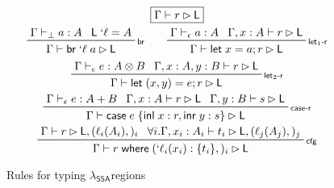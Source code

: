 \documentclass[acmsmall,screen,review]{acmart}
\newcommand{\ms}[1]{\ensuremath{\mathsf{#1}}}
\newcommand{\lbl}[1]{{`#1}}
\newcommand{\lto}{:}
\newcommand{\linl}[1]{\ms{inl}\;{#1}}
\newcommand{\linr}[1]{\ms{inr}\;{#1}}
\newcommand{\letstmt}[3]{\ensuremath{\ms{let}\;#1 = #2; #3}}
\newcommand{\brb}[2]{\ms{br}\;#1\;#2}
\newcommand{\lbrb}[2]{\brb{\lbl{#1}}{#2}}
\newcommand{\casestmt}[5]{\ms{case}\;#1\;\{\linl{#2} \lto #3, \linr{#4} \lto #5\}}
\newcommand{\where}[2]{#1\;\ms{where}\;#2}
\newcommand{\wbranch}[3]{#1(#2) \lto \{#3\}}
\newcommand{\lwbranch}[3]{\wbranch{\lbl{#1}}{#2}{#3}}
\newcommand{\bhyp}[2]{#1 : #2}
\newcommand{\lhyp}[2]{#1(#2)}
\newcommand{\rle}[1]{{\scriptsize\textsf{#1}}}
\newcommand{\hasty}[4]{#1 \vdash_{#2} #3: {#4}}
\newcommand{\haslb}[3]{#1 \vdash #2 \rhd #3}
\newcommand{\isotopessa}{\(\lambda_{\ms{SSA}}\)}
\begin{document}
\begin{figure}[H]
  \begin{gather*}
    \boxed{\haslb{\Gamma}{r}{\ms{L}}} \\
    \prftree[r]{\rle{br}}{\hasty{\Gamma}{\bot}{a}{A}}{\ms{L}\;\lbl{\ell} = A}
      {\haslb{\Gamma}{\lbrb{\ell}{a}}{\ms{L}}} \qquad
    \prftree[r]{\rle{let$_1$-r}}
      {\hasty{\Gamma}{\epsilon}{a}{A}}
      {\haslb{\Gamma, \bhyp{x}{A}}{r}{\ms{L}}}
      {\haslb{\Gamma}{\letstmt{x}{a}{r}}{\ms{L}}} \\
    \prftree[r]{\rle{let$_2$-r}}
      {\hasty{\Gamma}{\epsilon}{e}{A \otimes B}}
      {\haslb{\Gamma, \bhyp{x}{A}, \bhyp{y}{B}}{r}{\ms{L}}}
      {\haslb{\Gamma}{\letstmt{(x, y)}{e}{r}}{\ms{L}}} \\
    \prftree[r]{\rle{case-r}}
      {\hasty{\Gamma}{\epsilon}{e}{A + B}}
      {\haslb{\Gamma, \bhyp{x}{A}}{r}{\ms{L}}}
      {\haslb{\Gamma, \bhyp{y}{B}}{s}{\ms{L}}}
      {\haslb{\Gamma}{\casestmt{e}{x}{r}{y}{s}}{\ms{L}}} \\
    \prftree[r]{\rle{cfg}}
      {\haslb{\Gamma}{r}{\ms{L}, (\lhyp{\ell_i}{A_i},)_i}}
      {\forall i. \haslb{\Gamma, \bhyp{x_i}{A_i}}{t_i}{\ms{L}, (\lhyp{\ell_j}{A_j},)_j}}
      {\haslb{\Gamma}{\where{r}{(\lwbranch{\ell_i}{x_i}{t_i},)_i}}{\ms{L}}}
  \end{gather*}
  \caption{Rules for typing \isotopessa regions}
  \Description{}
  \label{fig:ssa-reg-rules}
\end{figure}
\end{document}
